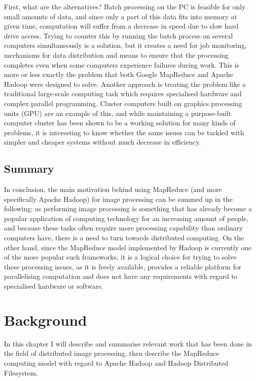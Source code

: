 \documentclass [12pt,a4paper]{report}
\begin{document}
First, what are the alternatives? Batch processing on the PC is feasible for only small amounts of data, and since only a part of this data fits into memory at given time, computation will suffer from a decrease in speed due to slow hard drive access. Trying to counter this by running the batch process on several computers simultaneously is a solution, but it creates a need for job monitoring, mechanisms for data distribution and means to ensure that the processing completes even when some computers experience failures during work. This is more or less exactly the problem that both Google MapReduce and Apache Hadoop were designed to solve. Another approach is treating the problem like a traditional large-scale computing task which requires specialised hardware and complex parallel programming. Cluster computers built on graphics processing units (GPU) are an example of this, and while maintaining a purpose-built computer cluster has been shown to be a working solution for many kinds of problems, it is interesting to know whether the same issues can be tackled with simpler and cheaper systems without much decrease in efficiency.

\section{Summary}

In conclusion, the main motivation behind using MapReduce (and more specifically Apache Hadoop) for image processing can be summed up in the following: as performing image processing is something that has already become a popular application of computing technology for an increasing amount of people, and because these tasks often require more processing capability than ordinary computers have, there is a need to turn towards distributed computing. On the other hand, since the MapReduce model implemented by Hadoop is currently one of the more popular such frameworks, it is a logical choice for trying to solve these processing issues, as it is freely available, provides a reliable platform for parallelising computation and does not have any requirements with regard to specialised hardware or software.

\chapter{Background}

In this chapter I will describe and summarise relevant work that has been done in the field of distributed image processing, then describe the MapReduce computing model with regard to Apache Hadoop and Hadoop Distributed Filesystem.
\end{document}
